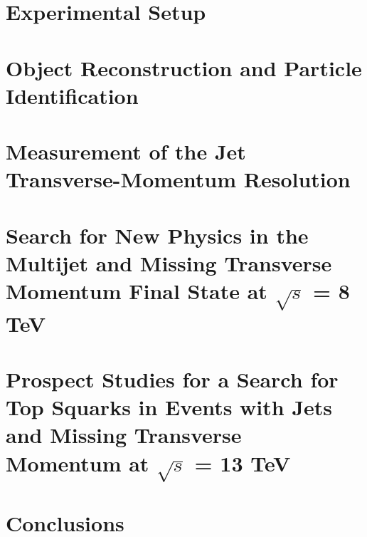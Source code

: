 \documentclass[
twoside=true,
BCOR10mm,
headsepline,     %
headings=normal,
open=right,
numbers=noenddot, %
a4paper
]{scrreprt} %
\begin{document}
\chapter{Experimental Setup} \label{chap:Detector}


\chapter{Object Reconstruction and Particle Identification} \label{chap:Objects}


\chapter{Measurement of the Jet Transverse-Momentum Resolution} \label{chap:Resolution}


\chapter[Search for New Physics with Jets and Missing Transverse Momentum]{Search for New Physics in the Multijet and Missing Transverse Momentum Final State at $\sqrt{s}$ = 8 TeV} \label{chap:RA2}


\chapter[Prospect Studies for a Search for Top Squarks at $\sqrt{s}$ = 13 TeV]{Prospect Studies for a Search for Top Squarks in Events with Jets and Missing Transverse Momentum at $\sqrt{s}$ = 13 TeV} \label{chap:Stop}


\chapter{Conclusions} \label{chap:Conclusion}



\appendix
%





\cleardoublepage
\thispagestyle{empty}
\chapter*{~}
%
\end{document}
